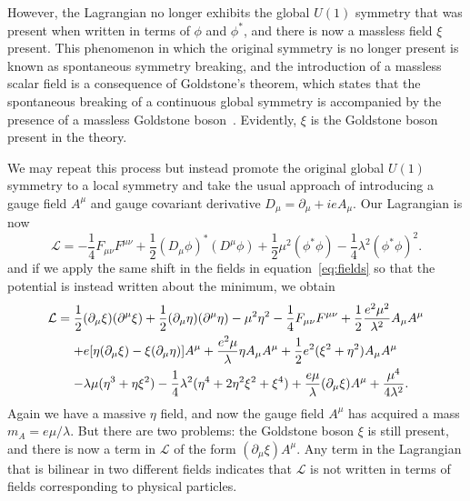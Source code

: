 However, the Lagrangian no longer exhibits the global $U(1)$ symmetry that was present when written in terms of $\phi$ and $\phi^*$, and there is now a massless field $\xi$ present.
This phenomenon in which the original symmetry is no longer present is known as spontaneous symmetry breaking, and the introduction of a massless scalar field is a consequence of Goldstone's theorem, which states that the spontaneous breaking of a continuous global symmetry is accompanied by the presence of a massless Goldstone boson~\cite{PhysRev.127.965}.
Evidently, $\xi$ is the Goldstone boson present in the theory.

We may repeat this process but instead promote the original global $U(1)$ symmetry to a local symmetry and take the usual approach of introducing a gauge field $A^\mu$ and gauge covariant derivative $D_\mu=\partial_\mu+ieA_\mu$.
Our Lagrangian is now
\begin{equation}
  \mathcal{L}=-\frac{1}{4}F_{\mu\nu}F^{\mu\nu}+\frac{1}{2}(D_\mu\phi)^*(D^\mu\phi)+\frac{1}{2}\mu^2(\phi^*\phi)-\frac{1}{4}\lambda^2(\phi^*\phi)^2.
\end{equation}
and if we apply the same shift in the fields in equation~\ref{eq:fields} so that the potential is instead written about the minimum, we obtain
\begin{equation}
  \begin{aligned}
    \mathcal{L} &= \frac{1}{2}(\partial_\mu\xi)(\partial^\mu\xi)+\frac{1}{2}(\partial_\mu\eta)(\partial^\mu\eta)-\mu^2\eta^2-\frac{1}{4}F_{\mu\nu}F^{\mu\nu}+\frac{1}{2}\frac{e^2\mu^2}{\lambda^2}A_\mu A^\mu\\
    &\equad+ e[\eta(\partial_\mu\xi)-\xi(\partial_\mu\eta)]A^\mu+\frac{e^2\mu}{\lambda}\eta A_\mu A^\mu+\frac{1}{2}e^2(\xi^2+\eta^2)A_\mu A^\mu\\
    &\equad- \lambda\mu(\eta^3+\eta\xi^2)-\frac{1}{4}\lambda^2(\eta^4+2\eta^2\xi^2+\xi^4)+\frac{e\mu}{\lambda}(\partial_\mu\xi)A^\mu+\frac{\mu^4}{4\lambda^2}.
  \end{aligned}
\end{equation}
Again we have a massive $\eta$ field, and now the gauge field $A^\mu$ has acquired a mass $m_A=e\mu/\lambda$.
But there are two problems: the Goldstone boson $\xi$ is still present, and there is now a term in $\mathcal{L}$ of the form $(\partial_\mu\xi)A^\mu$.
Any term in the Lagrangian that is bilinear in two different fields indicates that $\mathcal{L}$ is not written in terms of fields corresponding to physical particles.

